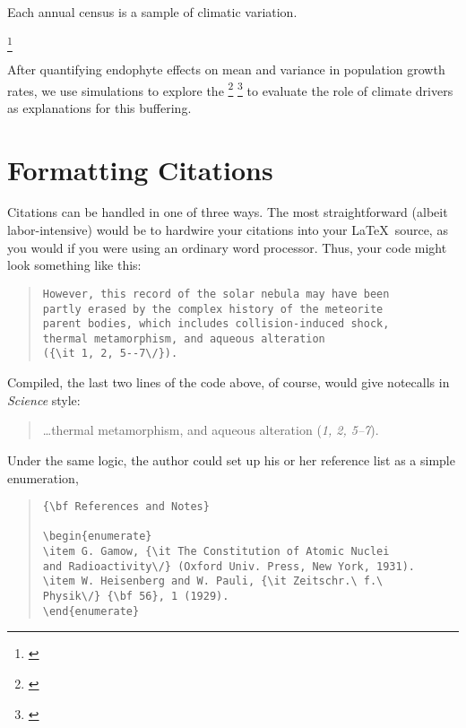 \documentclass[12pt]{article}
\newcommand{\tom}[2]{{\color{red}{#1}}\footnote{\textit{\color{red}{#2}}}}
\begin{document}
Each annual census is a sample of climatic variation. 


\tom{Across 14 years, the data contain 31,216 individual-transition years.}{Put in results.} 

After quantifying endophyte effects on mean and variance in population growth rates, we use simulations to explore the \tom{consequences of variance buffering under increased variance}{SHould be emphasized earlier. It's cool and novel.} \tom{and construct climate-explicit population models}{I would not mention this here since it is not central to the story of the paper.} to evaluate the role of climate drivers as explanations for this buffering. 




\section*{Formatting Citations}

Citations can be handled in one of three ways.  The most
straightforward (albeit labor-intensive) would be to hardwire your
citations into your \LaTeX\ source, as you would if you were using an
ordinary word processor.  Thus, your code might look something like
this:


\begin{quote}
\begin{verbatim}
However, this record of the solar nebula may have been
partly erased by the complex history of the meteorite
parent bodies, which includes collision-induced shock,
thermal metamorphism, and aqueous alteration
({\it 1, 2, 5--7\/}).
\end{verbatim}
\end{quote}


\noindent Compiled, the last two lines of the code above, of course, would give notecalls in {\it Science\/} style:

\begin{quote}
\ldots thermal metamorphism, and aqueous alteration ({\it 1, 2, 5--7\/}).
\end{quote}

Under the same logic, the author could set up his or her reference list as a simple enumeration,

\begin{quote}
\begin{verbatim}
{\bf References and Notes}

\begin{enumerate}
\item G. Gamow, {\it The Constitution of Atomic Nuclei
and Radioactivity\/} (Oxford Univ. Press, New York, 1931).
\item W. Heisenberg and W. Pauli, {\it Zeitschr.\ f.\ 
Physik\/} {\bf 56}, 1 (1929).
\end{enumerate}
\end{verbatim}
\end{quote}
\end{document}
